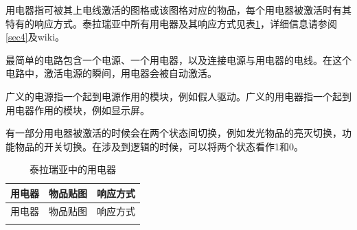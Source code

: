 用电器指可被其上电线激活的图格或该图格对应的物品，每个用电器被激活时有其特有的响应方式。泰拉瑞亚中所有用电器及其响应方式见表\ref{yongdianqi}，详细信息请参阅\autoref{sec4}及wiki。

最简单的电路包含一个电源、一个用电器，以及连接电源与用电器的电线。在这个电路中，激活电源的瞬间，用电器会被自动激活。

广义的电源指一个起到电源作用的模块，例如假人驱动。广义的用电器指一个起到用电器作用的模块，例如显示屏。

有一部分用电器被激活的时候会在两个状态间切换，例如发光物品的亮灭切换，功能物品的开关切换。在涉及到逻辑的时候，可以将两个状态看作1和0。

\begin{longtable}{c|c|c}
	\caption{泰拉瑞亚中的用电器}\label{yongdianqi}\\
	用电器		&	物品贴图	&	响应方式	\\
	\hline \hline
	\endfirsthead
用电器		&	物品贴图	&	响应方式	\\
\hline \hline
\endhead
\hline
\endfoot



\end{longtable}
